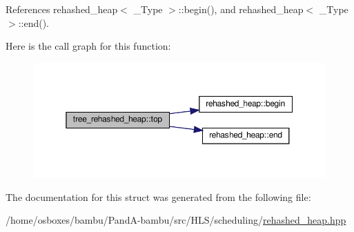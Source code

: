References rehashed\+\_\+heap$<$ \+\_\+\+Type $>$\+::begin(), and rehashed\+\_\+heap$<$ \+\_\+\+Type $>$\+::end().

Here is the call graph for this function\+:
\nopagebreak
\begin{figure}[H]
\begin{center}
\leavevmode
\includegraphics[width=350pt]{de/d91/structtree__rehashed__heap_ae71af5931de670e3b2d159c70e9e4a4e_cgraph}
\end{center}
\end{figure}


The documentation for this struct was generated from the following file\+:\begin{DoxyCompactItemize}
\item 
/home/osboxes/bambu/\+Pand\+A-\/bambu/src/\+H\+L\+S/scheduling/\hyperlink{rehashed__heap_8hpp}{rehashed\+\_\+heap.\+hpp}\end{DoxyCompactItemize}
